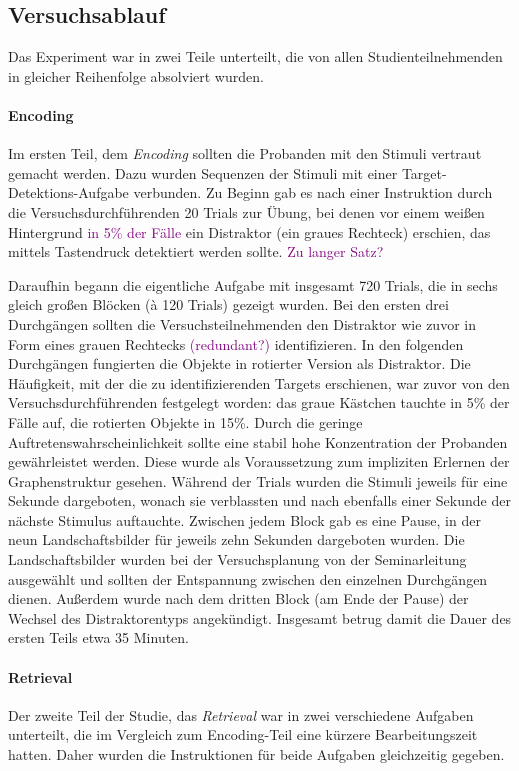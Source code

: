 \documentclass[preprint,12pt]{elsarticle}
\begin{document}
\subsection{Versuchsablauf}
Das Experiment war in zwei Teile unterteilt, die von allen Studienteilnehmenden in gleicher Reihenfolge absolviert wurden.

\paragraph{Encoding} Im ersten Teil, dem \textit{Encoding} sollten die Probanden mit den Stimuli vertraut gemacht werden. Dazu wurden Sequenzen der Stimuli mit einer Target-Detektions-Aufgabe verbunden. Zu Beginn gab es nach einer Instruktion durch die Versuchsdurchführenden 20 Trials zur Übung, bei denen vor einem weißen Hintergrund \textcolor{purple}{in 5\% der Fälle} ein Distraktor (ein graues Rechteck) erschien, das mittels Tastendruck detektiert werden sollte. \textcolor{purple}{Zu langer Satz?}

Daraufhin begann die eigentliche Aufgabe mit insgesamt 720 Trials, die in sechs gleich großen Blöcken (à 120 Trials) gezeigt wurden. Bei den ersten drei Durchgängen sollten die Versuchsteilnehmenden den Distraktor wie zuvor in Form eines grauen Rechtecks \textcolor{purple}{(redundant?)} identifizieren. In den folgenden Durchgängen fungierten die Objekte in rotierter Version als Distraktor. Die Häufigkeit, mit der die zu identifizierenden Targets erschienen, war zuvor von den Versuchsdurchführenden festgelegt worden: das graue Kästchen tauchte in 5\% der Fälle auf, die rotierten Objekte in 15\%. Durch die geringe Auftretenswahrscheinlichkeit sollte eine stabil hohe Konzentration der Probanden gewährleistet werden. Diese wurde als Voraussetzung zum impliziten Erlernen der Graphenstruktur gesehen.
Während der Trials wurden die Stimuli jeweils für eine Sekunde dargeboten, wonach sie verblassten und nach ebenfalls einer Sekunde der nächste Stimulus auftauchte. Zwischen jedem Block gab es eine Pause, in der neun Landschaftsbilder für jeweils zehn Sekunden dargeboten wurden. Die Landschaftsbilder wurden bei der Versuchsplanung von der Seminarleitung ausgewählt und sollten der Entspannung zwischen den einzelnen Durchgängen dienen. Außerdem wurde nach dem dritten Block (am Ende der Pause) der Wechsel des Distraktorentyps angekündigt. Insgesamt betrug damit die Dauer des ersten Teils etwa 35 Minuten.

\paragraph{Retrieval} Der zweite Teil der Studie, das \textit{Retrieval} war in zwei verschiedene Aufgaben unterteilt, die im Vergleich zum Encoding-Teil eine kürzere Bearbeitungszeit hatten. Daher wurden die Instruktionen für beide Aufgaben gleichzeitig gegeben.
\end{document}
